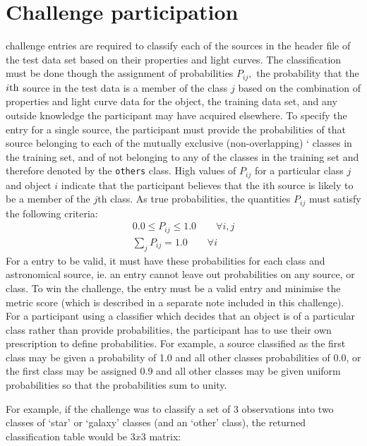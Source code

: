 \documentclass[\docopts]{\docclass}
\begin{document}
\section{Challenge participation}
\label{sec:conclusion}
{\plasticc} challenge entries are required to classify each of the sources in the header file of the test data set  based on their properties and light curves. The classification must be done though the assignment of probabilities $P_{ij},$ 
the probability that the $i\rm{th}$ source in the test data is a member of the class $j$ based on the combination of properties and light curve data for the object, the training data set, and any outside knowledge the participant may have acquired elsewhere. To specify the entry for a single source, the participant must provide the probabilities of that source belonging to each of the mutually exclusive (non-overlapping) `{{\numclasses}}  classes in the training set, and of not belonging to any of the classes in the training set and therefore denoted by the {\tt others} class. High values of $P_{ij}$ for a particular class $j$ and object $i$ indicate that the participant believes that the ith source is likely to be a member of the $j$th class. 
As true probabilities, the quantities $P_{ij}$ must satisfy the following criteria:
\begin{eqnarray*}
0.0 \leq P_{ij} \leq 1.0 \qquad \forall i, j \nonumber \\
\sum_{j} P_{ij} = 1.0 \qquad \forall i
\nonumber
\end{eqnarray*}
For a {\plasticc} entry to be valid, it must have these probabilities for each class and astronomical source, ie. an entry cannot leave out probabilities on any source, or class. To win the challenge, the entry must be a valid entry and minimise the {\plasticc} metric score (which is described in a separate note included in this challenge). 
For a participant using a classifier which decides that an object is of a particular class rather than provide probabilities, the participant has to use their own prescription to define probabilities. For example, a source classified as the first class may be given a probability of 1.0 and all other classes probabilities of 0.0, or the first class may be assigned 0.9 and all other classes may be given uniform probabilities so that the probabilities sum to unity. 

For example, if the challenge was to classify a set of 3 observations into two classes of `star' or `galaxy' classes (and an `other' class), the returned classification table would be $3x3$ matrix:
\end{document}
